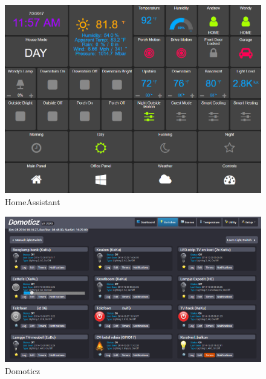 \begin{figure}[h]
  \includegraphics[width=\linewidth]{homeAssistant.png}
  \caption{HomeAssistant}
  \label{fig:homeAssistant}
\end{figure}

\begin{figure}[h]
  \includegraphics[width=\linewidth]{domoticz.png}
  \caption{Domoticz}
  \label{fig:domoticz}
\end{figure}